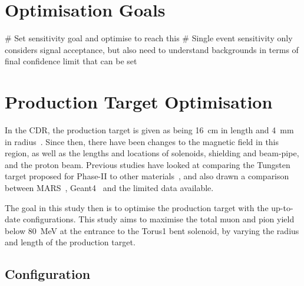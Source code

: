 \section{Optimisation Goals}
\begin{easylist}
# Set sensitivity goal and optimise to reach this
# Single event sensitivity only considers signal acceptance, but also need to understand backgrounds in terms of final confidence limit that can be set
\end{easylist}

\section{Production Target Optimisation}
In the \phaseII \ac{CDR}, the production target is given as being 16~cm in
length and 4~mm in radius~\cite{CDR}.  Since then, there have been changes to
the magnetic field in this region, as well as the lengths and locations of
solenoids, shielding and beam-pipe, and the proton beam.  Previous studies have
looked at comparing the Tungsten target proposed for Phase-II to other
materials~\cite{thesis-AEdmonds}, and also drawn a comparison between
MARS~\cite{MARS}, Geant4~\cite{Geant4} and the limited data available.

The goal in this study then is to optimise the production target with the
up-to-date configurations.  This study aims to maximise the total muon and pion
yield below 80~MeV at the entrance to the Torus1 bent solenoid, by varying the
radius and length of the production target.


\subsection{Configuration} 


